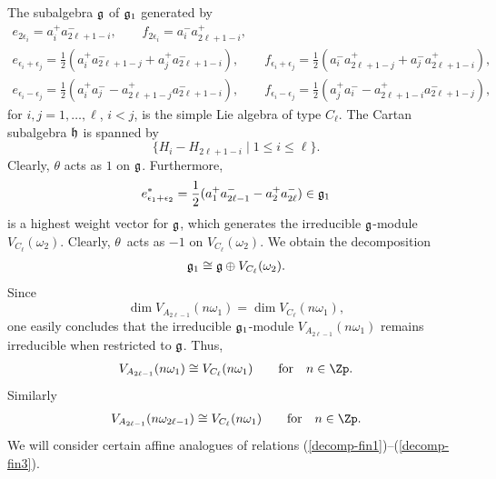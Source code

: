\documentclass[pdftex]{sigma}
\begin{document}
The subalgebra $\frak g$ of $\frak g _1$ generated by
\begin{gather*}
  e_{2 \epsilon _{i}} =a_i ^+  a_{2\ell +1-i} ^-, \qquad
    f_{2 \epsilon _{i}}=a_i ^-  a_{2\ell +1-i} ^+,
  \\
  e_{\epsilon _{i}+ \epsilon _{j}}=\frac{1}{2}(a_i ^+
 a_{2\ell +1-j} ^- + a_j ^+  a_{2\ell +1-i} ^-), \qquad
 f_{\epsilon _{i}+ \epsilon _{j}}=\frac{1}{2}(a_i ^- a_{2\ell +1-j}
^+ + a_j ^-  a_{2\ell +1-i} ^+),   \\
  e_{\epsilon _{i}- \epsilon _{j}}=\frac{1}{2}(a_i ^+
 a_{j} ^- - a_{2\ell +1-j} ^+
 a_{2\ell +1-i} ^-), \qquad
f_{\epsilon _{i}- \epsilon _{j}}=\frac{1}{2}(a_j ^+
 a_{i} ^- - a_{2\ell +1-i} ^+
 a_{2\ell +1-j} ^-),
\end{gather*}
for $i,j =1, \dots, \ell$, $i<j$, is the simple Lie algebra of type
$C_{\ell}$. The Cartan subalgebra $\frak h$ is spanned by
\[
\{ H_i - H_{2\ell +1-i}  \; \vert \; 1 \le i \le  \ell \}.
\]
Clearly, $\theta$ acts as $1$ on $\frak g$. Furthermore, \[
e_{\epsilon _{1}+ \epsilon _{2}} ^*=\frac{1}{2}(a_1 ^+
 a_{2\ell -1} ^- - a_2 ^+  a_{2\ell} ^-) \in \frak g _1
\]
is a highest weight vector for $\frak g$, which generates the
irreducible $\frak g$-module $V_{C_{\ell}}(\omega _2)$. Clearly,
$\theta$~acts as $-1$ on $V_{C_{\ell}}(\omega _2)$. We obtain the
decomposition
\begin{gather} \label{decomp-fin1}
 \frak g _1 \cong \frak g \oplus V_{C_{\ell}}(\omega _2).
  \end{gather}
Since
%
\[ \dim V_{A_{2\ell -1}} (n \omega_1) = \dim V_{C_{\ell }} (n
\omega_1),\] one easily concludes that the irreducible $\frak g
_1$-module $V_{A_{2\ell -1}} (n \omega_1)$ remains irreducible when
restricted to $\frak g$. Thus,
\begin{gather} \label{decomp-fin2} V_{A_{2\ell -1} } (n \omega_1) \cong V_{C_{
\ell  } } (n \omega_1) \qquad \mbox{for} \quad n \in \Zp.
\end{gather}
Similarly
\begin{gather} \label{decomp-fin3} V_{A_{2\ell -1} } (n \omega_{2 \ell -1})
\cong V_{C_{ \ell  } } (n \omega_1) \qquad \mbox{for} \quad n \in \Zp.
\end{gather}
We will consider certain af\/f\/ine analogues of relations
(\ref{decomp-fin1})--(\ref{decomp-fin3}).
\end{document}
